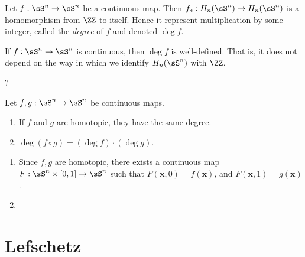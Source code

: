 \begin{definition}
  Let $f : \sS^n \to \sS^n$ be a continuous map. Then $f_* :
  H_n(\sS^n) \to H_n(\sS^n)$ is a homomorphism from $\ZZ$ to itself.
  Hence it represent multiplication by some integer, called the
  \emph{degree} of $f$ and denoted $\deg f$.
\end{definition}
\begin{problem}[18.38]
  If $f : \sS^n \to \sS^n$ is continuous, then $\deg f$ is
  well-defined. That is, it does not depend on the way in which we
  identify $H_n(\sS^n)$ with $\ZZ$.
\end{problem}
\begin{solution}
  ?
\end{solution}
\begin{problem}[18.39]
  Let $f,g : \sS^n \to \sS^n$ be continuous maps.
  \begin{enumerate}
    \item If $f$ and $g$ are homotopic, they have the same degree.
    \item $\deg (f \circ g) = (\deg f) \cdot (\deg g)$.
  \end{enumerate}
\end{problem}
\begin{solution}
  \begin{enumerate}
    \item Since $f,g$ are homotopic, there exists a continuous map $F
      : \sS^n \times [0,1] \to \sS^n$ such that $F(\bm x, 0) = f(\bm
      x)$, and $F(\bm x, 1) = g(\bm x)$.
    \item
  \end{enumerate}
\end{solution}

\section{Lefschetz}


